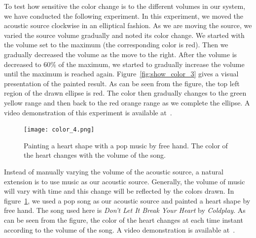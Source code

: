 To test how sensitive the color change is to the different volumes in our system, we have conducted the following experiment. In this experiment, we moved the acoustic source clockwise in an elliptical fashion. As we are moving the source, we varied the source volume gradually and noted its color change. We started with the volume set to the maximum (the corresponding color is red). Then we gradually decreased the volume as the move to the right. After the volume is decreased to $60\%$ of the maximum, we started to gradually increase the volume until the maximum is reached again. Figure~\ref{fig:show_color_3} gives a visual presentation of the painted result. As can be seen from the figure, the top left region of the drawn ellipse is red. The color then gradually changes to the green yellow range and then back to the red orange range as we complete the ellipse. A video demonstration of this experiment is available at~\cite{demo:color3}.

\begin{figure}[h!]
  \centering
    \texttt{[image: color\_4.png]}
    \caption{Painting a heart shape with a pop music by free hand. The color of the heart changes with the volume of the song.}
    \label{fig:show_color_2}
\end{figure}

Instead of manually varying the volume of the acoustic source, a natural extension is to use music as our acoustic source. Generally, the volume of music will vary with time and this change will be reflected by the colors drawn. In figure~\ref{fig:show_color_2}, we used a pop song as our acoustic source and painted a heart shape by free hand. The song used here is \emph{Don't Let It Break Your Heart} by \emph{Coldplay}. As can be seen from the figure, the color of the heart changes at each time instant according to the volume of the song. A video demonstration is available at~\cite{demo:color2}.


